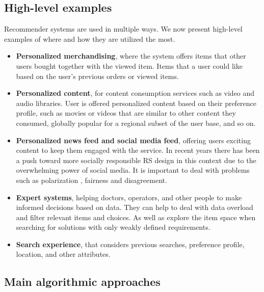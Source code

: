 \subsection{High-level examples}\label{subsec:01_rec_sys.high_level_examples}
Recommender systems are used in multiple ways. We now present high-level examples of where and how they are utilized the most.
\begin{itemize}
    \item \textbf{Personalized merchandising}, where the system offers items that other users bought together with the viewed item. Items that a user could like based on the user's previous orders or viewed items.
    
    \item \textbf{Personalized content}, for content consumption services such as video and audio libraries. User is offered personalized content based on their preference profile, such as movies or videos that are similar to other content they consumed, globally popular for a regional subset of the user base, and so on.
    
    \item \textbf{Personalized news feed and social media feed}, offering users exciting content to keep them engaged with the service. In recent years there has been a push toward more socially responsible RS design in this context due to the overwhelming power of social media. It is important to deal with problems such as polarization \cite{recommender_systems_fighting_polarization}, fairness and disagreement.
    
    \item \textbf{Expert systems}, helping doctors, operators, and other people to make informed decisions based on data. They can help to deal with data overload and filter relevant items and choices. As well as explore the item space when searching for solutions with only weakly defined requirements.
    
    \item \textbf{Search experience}, that considers previous searches, preference profile, location, and other attributes.
\end{itemize}


\subsection{Main algorithmic approaches}\label{subsec:01_rec_sys.main_alg_approaches}

